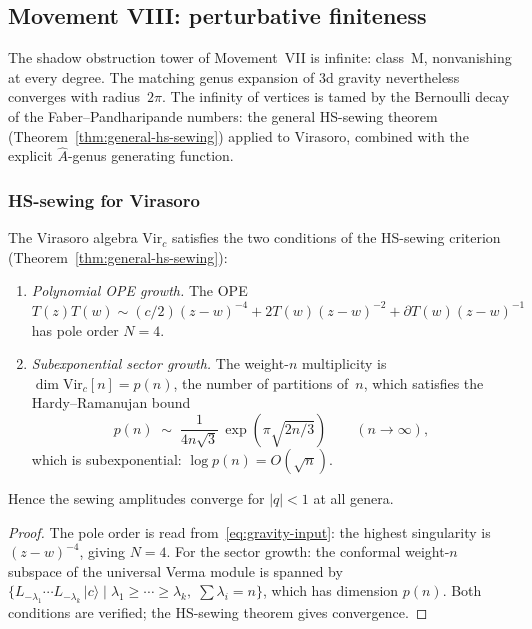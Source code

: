 
\subsection{Movement VIII: perturbative finiteness}
\label{subsec:gravity-perturbative-finiteness}

The shadow obstruction tower of Movement~VII is infinite: class~M,
nonvanishing at every degree. The matching genus expansion of
3d gravity nevertheless converges with radius~$2\pi$. The
infinity of vertices is tamed by the Bernoulli decay of the
Faber--Pandharipande numbers: the general HS-sewing theorem
(Theorem~\ref{thm:general-hs-sewing}) applied to Virasoro,
combined with the explicit $\hat A$-genus generating function.

\subsubsection*{HS-sewing for Virasoro}

\begin{proposition}
\label{prop:gravity-hs-sewing}
The Virasoro algebra $\mathrm{Vir}_c$ satisfies the two
conditions of the HS-sewing criterion
\textup{(}Theorem~\textup{\ref{thm:general-hs-sewing}}\textup{)}:
\begin{enumerate}[label=\textup{(\roman*)}]
\item \emph{Polynomial OPE growth.}\enspace
 The OPE $T(z)T(w) \sim (c/2)(z-w)^{-4} + 2T(w)(z-w)^{-2}
 + \partial T(w)(z-w)^{-1}$ has pole order $N = 4$.
\item \emph{Subexponential sector growth.}\enspace
 The weight-$n$ multiplicity is
 $\dim \mathrm{Vir}_c[n] = p(n)$, the number of partitions
 of~$n$, which satisfies the Hardy--Ramanujan bound
 \[
 p(n) \;\sim\;
 \frac{1}{4n\sqrt{3}}\,\exp\!\left(\pi\sqrt{2n/3}\right)
 \qquad (n \to \infty),
 \]
 which is subexponential: $\log p(n) = O(\sqrt{n})$.
\end{enumerate}
Hence the sewing amplitudes converge for $|q| < 1$ at all genera.
\end{proposition}

\begin{proof}
The pole order is read from~\eqref{eq:gravity-input}: the
highest singularity is $(z-w)^{-4}$, giving $N = 4$. For the
sector growth: the conformal weight-$n$ subspace of the universal
Verma module is spanned by
$\{L_{-\lambda_1} \cdots L_{-\lambda_k}\,|c\rangle \mid
\lambda_1 \ge \cdots \ge \lambda_k,\;
\sum \lambda_i = n\}$,
which has dimension $p(n)$. Both conditions are verified; the
HS-sewing theorem gives convergence.
\end{proof}

